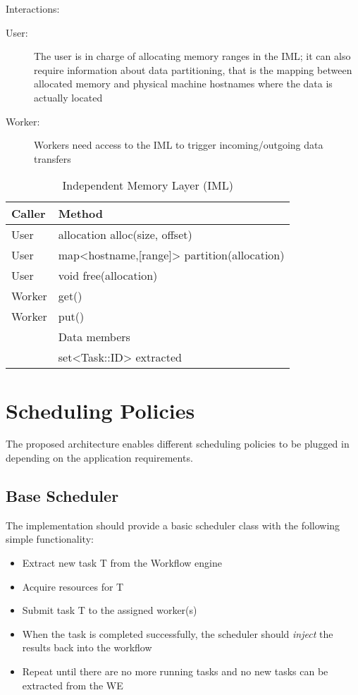 \documentclass[10pt]{article}
\newcommand{\user}{User\xspace}
\newcommand{\worker}{Worker\xspace}
\newcommand{\iml}{IML\xspace}
\newcommand{\we}{WE\xspace}
\newcommand{\task}{Task\xspace}
\newcommand{\id}{::ID\xspace}
\begin{document}
Interactions:
\begin{description}
    \item [\user:] The user is in charge of allocating memory ranges in the
    \iml; it can also require information about data partitioning, that is the
    mapping between allocated memory and physical machine hostnames where the data
    is actually located
    \item [\worker:] Workers need access to the \iml to trigger
    incoming/outgoing data transfers
\end{description}
%
\begin{table}[ht]
    \centering
    \caption{Independent Memory Layer (IML)}
    \label{tab:iml}
    \bgroup
    \setlength{\tabcolsep}{2em}
    \begin{tabular}{ll}
        \toprule
        Caller & Method \\
        \midrule
        \user & allocation alloc(size, offset) \\
        \user & map<hostname,[range]> partition(allocation) \\
        \user & void free(allocation)  \\
        \worker & get() \\
        \worker & put() \\
        \midrule
        & Data members \\
        \midrule
        & set<\task\id> extracted \\
        \bottomrule
    \end{tabular}
    \egroup
\end{table}
%



\section{Scheduling Policies}

The proposed architecture enables different scheduling policies to be plugged 
in depending on the application requirements.

\subsection{Base Scheduler}
The implementation should provide a basic scheduler class with the following
simple functionality:
\begin{itemize}
    \item Extract new task T from the Workflow engine
    \item Acquire resources for T
    \item Submit task T to the assigned worker(s) 
    \item When the task is completed successfully, the scheduler should
    \emph{inject} the results back into the workflow
    \item Repeat until there are no more running tasks and no new tasks can 
    be extracted from the \we
\end{itemize}
\end{document}
